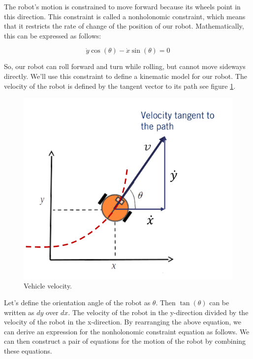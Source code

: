 The robot's motion is constrained to move forward because its wheels point in this direction. 
This constraint is called a nonholonomic constraint, which means that it restricts the rate of change of the position of our robot. Mathematically, this can be expressed as follows:

\begin{equation}
\dot{y}\cos(\theta) - \dot{x}\sin(\theta) = 0
\end{equation} 


So, our robot can roll forward and turn while rolling, but cannot move sideways directly. We'll use this constraint to define a kinematic model for our robot. The velocity of the robot is defined by the tangent vector to its path see figure \ref{vehicle_path}. 

\begin{figure}[!htb]
\begin{center}
\includegraphics[scale=0.290]{img/kinematics/vehicle_path.jpeg}
\end{center}
\caption{Vehicle velocity.}
\label{vehicle_path}
\end{figure}


Let's define the orientation angle of the robot as $\theta$. Then $\tan(\theta)$ can be written as $dy$ over $dx$. 
The velocity of the robot in the y-direction divided by the velocity of the robot in the x-direction. 
By rearranging the above equation, we can derive an expression for the nonholonomic constraint equation as follows. 
We can then construct a pair of equations for the motion of the robot by combining these equations. 


